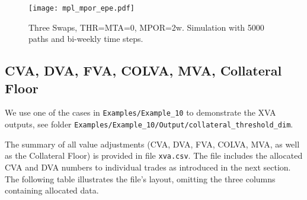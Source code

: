 \documentclass[12pt, a4paper]{article}
\begin{document}

\begin{figure}[h!]
\begin{center}
\texttt{[image: mpl\_mpor\_epe.pdf]}
\end{center}
\caption{Three Swaps, THR=MTA=0, MPOR=2w. Simulation with 5000 paths and bi-weekly time steps.}
\label{fig_10}
\end{figure}

\subsection*{CVA, DVA, FVA, COLVA, MVA, Collateral Floor}

We use one of the cases in {\tt Examples/Example\_10} to demonstrate the
XVA outputs, see folder {\tt Examples/Example\_10/Output/collateral\_threshold\_dim}.

\medskip The summary of all value adjustments (CVA, DVA, FVA, COLVA, MVA, as well as the Collateral Floor) is provided
in file {\tt xva.csv}.  The file includes the allocated CVA and DVA numbers to individual trades as introduced in the
next section. The following table illustrates the file's layout, omitting the three columns containing allocated data.

\begin{center}
\end{center}
\end{document}
